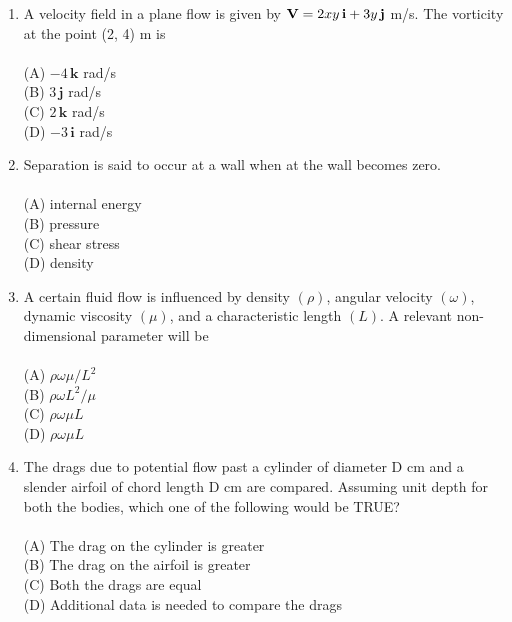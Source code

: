 \documentclass[journal,12pt,onecolumn]{IEEEtran}
\begin{document}
\begin{enumerate}
\item A velocity field in a plane flow is given by ${\bf V} = 2 x y\, \mathbf{i} + 3 y\, \mathbf{j}$ m/s. The vorticity at the point (2, 4) m is\\
\vspace{0.2cm}
\hfill{} \\
(A) $-4\, \mathbf{k}$ rad/s\\
(B) $3\, \mathbf{j}$ rad/s\\
(C) $2\, \mathbf{k}$ rad/s\\
(D) $-3\, \mathbf{i}$ rad/s
\vspace{0.5cm}

\item Separation is said to occur at a wall when at the wall \underline{\hspace{2cm}} becomes zero.\\
\vspace{0.2cm}
\hfill{} \\
(A) internal energy\\
(B) pressure\\
(C) shear stress\\
(D) density
\vspace{0.5cm}

\item A certain fluid flow is influenced by density $(\rho)$, angular velocity $(\omega)$, dynamic viscosity $(\mu)$, and a characteristic length $(L)$. A relevant non-dimensional parameter will be\\
\vspace{0.2cm}
\hfill{} \\
(A) $\rho \omega \mu / L^2$\\
(B) $\rho \omega L^2 / \mu$\\
(C) $\rho \omega \mu L$\\
(D) $\rho \omega \mu L$
\vspace{0.5cm}

\item The drags due to potential flow past a cylinder of diameter D cm and a slender airfoil of chord length D cm are compared. Assuming unit depth for both the bodies, which one of the following would be TRUE?\\
\vspace{0.2cm}
\hfill{} \\
(A) The drag on the cylinder is greater\\
(B) The drag on the airfoil is greater\\
(C) Both the drags are equal\\
(D) Additional data is needed to compare the drags
\vspace{0.5cm}


\end{enumerate}
\end{document}
